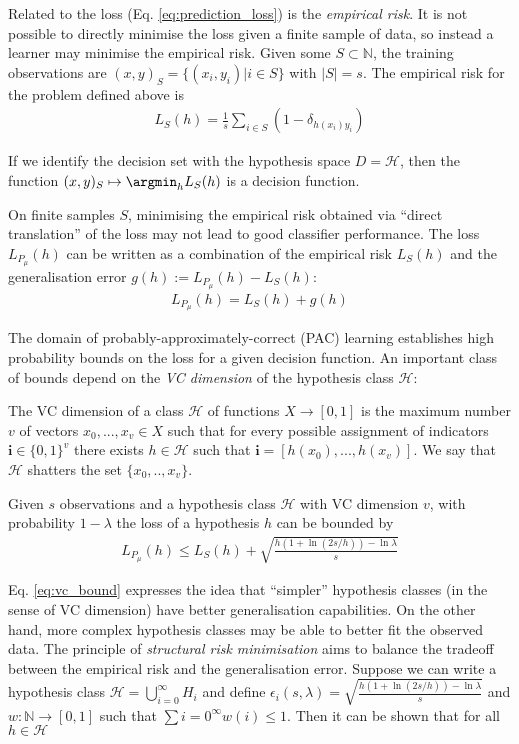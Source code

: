Related to the loss (Eq. \ref{eq:prediction_loss}) is the \emph{empirical risk}. It is not possible to directly minimise the loss given a finite sample of data, so instead a learner may minimise the empirical risk. Given some $S\subset \mathbb{N}$, the training observations are $(x,y)_S=\{(x_i,y_i)|i\in S\}$ with $|S|=s$.  The empirical risk for the problem defined above is
\begin{align}
    L_S(h) = \frac{1}{s} \sum_{i\in S} (1-\delta_{h(x_i)y_i})
\end{align}

If we identify the decision set with the hypothesis space $D=\mathcal{H}$, then the function $(x,y)_S\mapsto \argmin_h L_S(h)$ is a decision function. 

On finite samples $S$, minimising the empirical risk obtained via ``direct translation'' of the loss may not lead to good classifier performance\cite{shalev-shwartz_understanding_2014,vapnik_nature_2013}. The loss $L_{P_\mu}(h)$ can be written as a combination of the empirical risk $L_S(h)$ and the generalisation error $g(h):= L_{P_\mu}(h)-L_S(h)$:
\begin{align}
    L_{P_\mu}(h) = L_S(h) + g(h)
\end{align}

The domain of probably-approximately-correct (PAC) learning establishes high probability bounds on the loss for a given decision function. An important class of bounds depend on the \emph{VC dimension} of the hypothesis class $\mathcal{H}$:

\begin{definition}
The VC dimension of a class $\mathcal{H}$ of functions $X\to [0,1]$ is the maximum number $v$ of vectors $x_0,...,x_v\in X$ such that for every possible assignment of indicators $\mathbf{i}\in \{0,1\}^v$ there exists $h\in \mathcal{H}$ such that $\mathbf{i}=[h(x_0),...,h(x_v)]$. We say that $\mathcal{H}$ shatters the set $\{x_0,..,x_v\}$.
\end{definition}

Given $s$ observations and a hypothesis class $\mathcal{H}$ with VC dimension $v$, with probability $1-\lambda$ the loss of a hypothesis $h$ can be bounded by
\begin{align}
    L_{P_\mu}(h) \leq L_S(h) + \sqrt{\frac{h(1+\ln(2s/h))-\ln\lambda}{s} } \label{eq:vc_bound}
\end{align}

Eq. \ref{eq:vc_bound} expresses the idea that ``simpler'' hypothesis classes (in the sense of VC dimension) have better generalisation capabilities. On the other hand, more complex hypothesis classes may be able to better fit the observed data. The principle of \emph{structural risk minimisation} aims to balance the tradeoff between the empirical risk and the generalisation error. Suppose we can write a hypothesis class $\mathcal{H}=\bigcup_{i=0}^\infty H_i$ and define $\epsilon_i(s,\lambda) = \sqrt{\frac{h(1+\ln(2s/h))-\ln\lambda}{s} } $ and $w:\mathbb{N}\to [0,1]$ such that $\sum{i=0}^\infty w(i)\leq 1$. Then it can be shown that for all $h\in \mathcal{H}$\cite{shalev-shwartz_understanding_2014}

